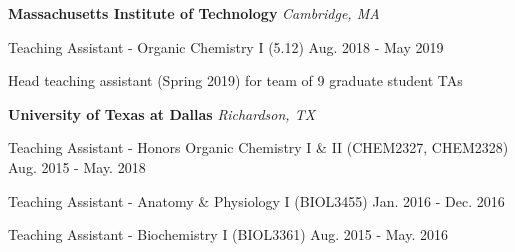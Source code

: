
\begin{rSection}{}{\bodyfont\bfseries\color{black} \hspace{-1.6em} {Massachusetts Institute of Technology}} \hfill{\bodyfont\slshape\color{awesome} {Cambridge, MA} \vspace{-0.5em}}
\end{rSection}

\begin{cventries}

  \cventry
    {Teaching Assistant - Organic Chemistry I (5.12)} %
    {} %
    {} %
    {Aug. 2018 - May 2019} %
    {
      \begin{cvitems} %
        \item[] {Head teaching assistant (Spring 2019) for team of 9 graduate student TAs}
      \end{cvitems}
    }

\begin{rSection}{}{\bodyfont\bfseries\color{black} \hspace{-1.6em} {University of Texas at Dallas}} \hfill{\bodyfont\slshape\color{awesome} {Richardson, TX} \vspace{-0.5em}}
\end{rSection}

\cventryshort
{Teaching Assistant - Honors Organic Chemistry I \& II (CHEM2327, CHEM2328)} %
{} %
{} %
{Aug. 2015 - May. 2018} %

\cventryshort
  {Teaching Assistant - Anatomy \& Physiology I (BIOL3455)} %
  {} %
  {} %
  {Jan. 2016 - Dec. 2016} %

\cventryshort
{Teaching Assistant - Biochemistry I (BIOL3361)} %
{} %
{} %
{Aug. 2015 - May. 2016} %

\end{cventries}

